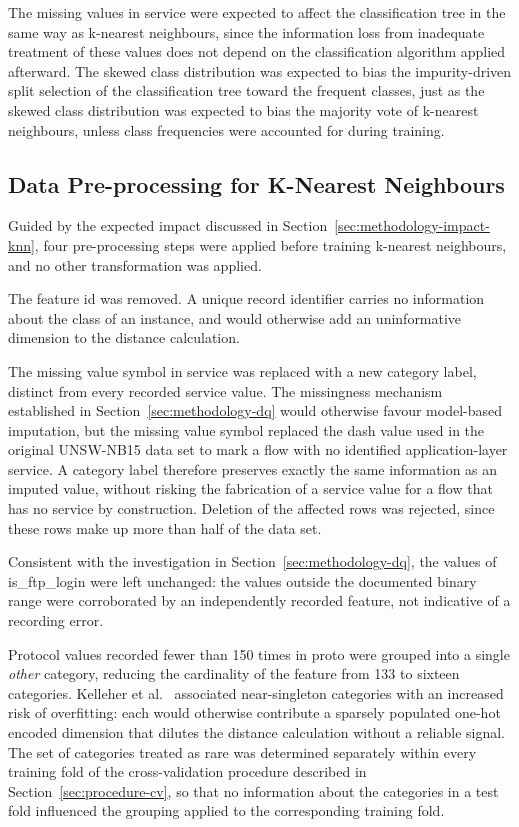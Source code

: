 \documentclass[10pt,conference]{IEEEtran}
\begin{document}
The missing values in service were expected to affect the classification tree in the same way as k-nearest neighbours, since the information loss from inadequate treatment of these values does not depend on the classification algorithm applied afterward. The skewed class distribution was expected to bias the impurity-driven split selection of the classification tree toward the frequent classes, just as the skewed class distribution was expected to bias the majority vote of k-nearest neighbours, unless class frequencies were accounted for during training.

\subsection{Data Pre-processing for K-Nearest Neighbours}
\label{sec:methodology-prep-knn}

Guided by the expected impact discussed in Section~\ref{sec:methodology-impact-knn}, four pre-processing steps were applied before training k-nearest neighbours, and no other transformation was applied.

The feature id was removed. A unique record identifier carries no information about the class of an instance, and would otherwise add an uninformative dimension to the distance calculation.

The missing value symbol in service was replaced with a new category label, distinct from every recorded service value. The missingness mechanism established in Section~\ref{sec:methodology-dq} would otherwise favour model-based imputation, but the missing value symbol replaced the dash value used in the original UNSW-NB15 data set to mark a flow with no identified application-layer service. A category label therefore preserves exactly the same information as an imputed value, without risking the fabrication of a service value for a flow that has no service by construction. Deletion of the affected rows was rejected, since these rows make up more than half of the data set.

Consistent with the investigation in Section~\ref{sec:methodology-dq}, the values of is\_ftp\_login were left unchanged: the values outside the documented binary range were corroborated by an independently recorded feature, not indicative of a recording error.

Protocol values recorded fewer than 150 times in proto were grouped into a single \emph{other} category, reducing the cardinality of the feature from 133 to sixteen categories. Kelleher et al.~\cite{kelleher2020} associated near-singleton categories with an increased risk of overfitting: each would otherwise contribute a sparsely populated one-hot encoded dimension that dilutes the distance calculation without a reliable signal. The set of categories treated as rare was determined separately within every training fold of the cross-validation procedure described in Section~\ref{sec:procedure-cv}, so that no information about the categories in a test fold influenced the grouping applied to the corresponding training fold.
\end{document}
